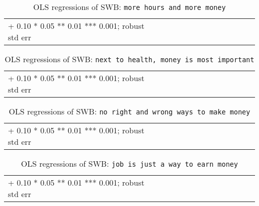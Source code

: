 \documentclass[10pt, letterpaper]{article}
\begin{document}
\begin{spacing}{1.8}
\begin{spacing}{.9} \begin{table}[H]\centering  \label{a} \begin{scriptsize} \begin{tabular}{p{1.8in}p{.5in}p{.5in}p{.5in}p{.5in}p{.5in}p{.5in}p{.5in}p{.5in}p{.5in}p{.5 in}p{.5in}p{.5 in}}\hline  \hline + 0.10 * 0.05 ** 0.01 *** 0.001; robust std err \end{tabular}\end{scriptsize}\caption{OLS regressions of SWB: \texttt{more hours and more money}}\end{table} \end{spacing}

\begin{spacing}{.9} \begin{table}[H]\centering  \label{b} \begin{scriptsize} \begin{tabular}{p{1.8in}p{.5in}p{.5in}p{.5in}p{.5in}p{.5in}p{.5in}p{.5in}p{.5in}p{.5in}p{.5 in}p{.5in}p{.5 in}}\hline  \hline + 0.10 * 0.05 ** 0.01 *** 0.001; robust std err \end{tabular}\end{scriptsize}\caption{OLS regressions of SWB: \texttt{next to  health, money is most  important}}\end{table} \end{spacing}

\begin{spacing}{.9} \begin{table}[H]\centering  \label{c} \begin{scriptsize} \begin{tabular}{p{1.8in}p{.5in}p{.5in}p{.5in}p{.5in}p{.5in}p{.5in}p{.5in}p{.5in}p{.5in}p{.5 in}p{.5in}p{.5 in}}\hline  \hline + 0.10 * 0.05 ** 0.01 *** 0.001; robust std err \end{tabular}\end{scriptsize}\caption{OLS regressions of SWB: \texttt{no right  and wrong ways to  make money}}\end{table} \end{spacing}

\begin{spacing}{.9} \begin{table}[H]\centering  \label{d} \begin{scriptsize} \begin{tabular}{p{1.8in}p{.5in}p{.5in}p{.5in}p{.5in}p{.5in}p{.5in}p{.5in}p{.5in}p{.5in}p{.5 in}p{.5in}p{.5 in}}\hline  \hline + 0.10 * 0.05 ** 0.01 *** 0.001; robust std err \end{tabular}\end{scriptsize}\caption{OLS regressions of SWB:  \texttt{job is just a way to earn money}}\end{table} \end{spacing}



\end{spacing}
\end{document}
